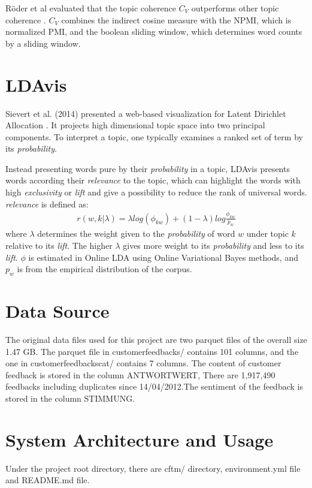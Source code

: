 \documentclass{article} %
\begin{document}
Röder et al evaluated that the topic coherence $C_V$ outperforms other topic coherence \cite{roder_exploring_2015}. $C_V$ combines the indirect cosine measure with the NPMI, which is normalized PMI, and the boolean sliding window, which determines word counts by a sliding window.

\section{LDAvis}
Sievert et al. (2014) presented a web-based visualization for Latent Dirichlet Allocation \cite{sievert_ldavis:_2014}. It projects high dimensional topic space into two principal components. To interpret a topic, one typically examines a ranked set of term by its \textit{probability}.

Instead presenting words pure by their \textit{probability} in a topic, LDAvis presents words according their \textit{relevance} to the topic, which can highlight the words with high \textit{exclusivity} or \textit{lift} \cite{bischof_summarizing_nodate} and give a possibility to reduce the rank of universal words. \textit{relevance} is defined as:
\begin{align}
      r(w, k|\lambda) = \lambda log(\phi_{kw}) + (1-\lambda)log \frac{\phi_{kw}}{p_w}
\end{align}
where $\lambda$ determines the weight given to the \textit{probability} of word $w$ under topic $k$ relative to its \textit{lift}. The higher $\lambda$ gives more weight to its \textit{probability} and less to its \textit{lift}. $\phi$ is estimated in Online LDA using Online Variational Bayes methods, and $p_w$ is from the empirical distribution of the corpus.

\section{Data Source}
The original data files used for this project are two parquet files of the overall size 1.47 GB. The parquet file in customer\textunderscore{}feedbacks/ contains 101 columns, and the one in customer\textunderscore{}feedbacks\textunderscore{}cat/ contains 7 columns. The content of customer feedback is stored in the column ANTWORT\textunderscore{}WERT, There are 1,917,490 feedbacks including duplicates since 14/04/2012.The sentiment of the feedback is stored in the column STIMMUNG.

\section{System Architecture and Usage}
Under the project root directory, there are cftm/ directory, environment.yml file and README.md file.
\end{document}
